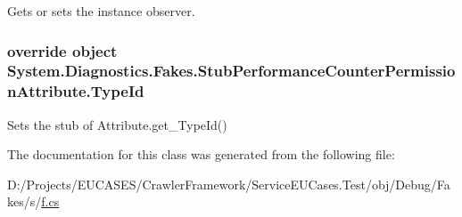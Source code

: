 Gets or sets the instance observer.

\hypertarget{class_system_1_1_diagnostics_1_1_fakes_1_1_stub_performance_counter_permission_attribute_af4d0ac3ceb925afd7ffea6ad1495ec11}{
\subsubsection[{Type\-Id}]{\setlength{\rightskip}{0pt plus 5cm}override object System.\-Diagnostics.\-Fakes.\-Stub\-Performance\-Counter\-Permission\-Attribute.\-Type\-Id\hspace{0.3cm}{\ttfamily [get]}}}\label{class_system_1_1_diagnostics_1_1_fakes_1_1_stub_performance_counter_permission_attribute_af4d0ac3ceb925afd7ffea6ad1495ec11}


Sets the stub of Attribute.\-get\-\_\-\-Type\-Id()



The documentation for this class was generated from the following file\-:\begin{DoxyCompactItemize}
\item 
D\-:/\-Projects/\-E\-U\-C\-A\-S\-E\-S/\-Crawler\-Framework/\-Service\-E\-U\-Cases.\-Test/obj/\-Debug/\-Fakes/s/\hyperlink{s_2f_8cs}{f.\-cs}\end{DoxyCompactItemize}
